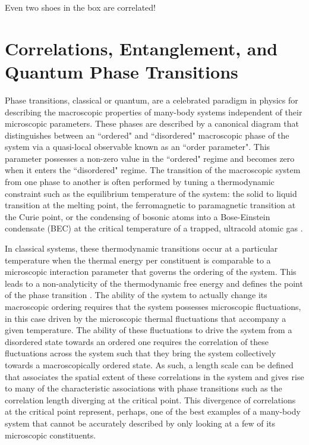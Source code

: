 \begin{savequote}[75mm]
Even two shoes in the box are correlated!
\end{savequote}

\chapter{Correlations, Entanglement, \newline and Quantum Phase Transitions} 
\label{sec:ch3}

Phase transitions, classical or quantum, are a celebrated paradigm in physics for describing the macroscopic properties of many-body systems independent of their microscopic parameters. These phases are described by a canonical diagram that distinguishes between an ``ordered" and ``disordered" macroscopic phase of the system via a quasi-local observable known as an ``order parameter". This parameter possesses a non-zero value in the ``ordered" regime and becomes zero when it enters the ``disordered" regime. The transition of the macroscopic system from one phase to another is often performed by tuning a thermodynamic constraint such as the equilibrium temperature of the system: the solid to liquid transition at the melting point, the ferromagnetic to paramagnetic transition at the Curie point, or the condensing of bosonic atoms into a Bose-Einstein condensate (BEC) at the critical temperature of a trapped, ultracold atomic gas \cite{Pethick2002,Sachdev2011,Kardar2012a,Kardar2012b}. 


In classical systems, these thermodynamic transitions occur at a particular temperature when the thermal energy per constituent is comparable to a microscopic interaction parameter that governs the ordering of the system. This leads to a non-analyticity of the thermodynamic free energy and defines the point of the phase transition \cite{Kardar2012a,Kardar2012b}. The ability of the system to actually change its macroscopic ordering requires that the system possesses microscopic fluctuations, in this case driven by the microscopic thermal fluctuations that accompany a given temperature. The ability of these fluctuations to drive the system from a disordered state towards an ordered one requires the correlation of these fluctuations across the system such that they bring the system collectively towards a macroscopically ordered state. As such, a length scale can be defined that associates the spatial extent of these correlations in the system and gives rise to many of the characteristic associations with phase transitions such as the correlation length diverging at the critical point. This divergence of correlations at the critical point represent, perhaps, one of the best examples of a many-body system that cannot be accurately described by only looking at a few of its microscopic constituents.

